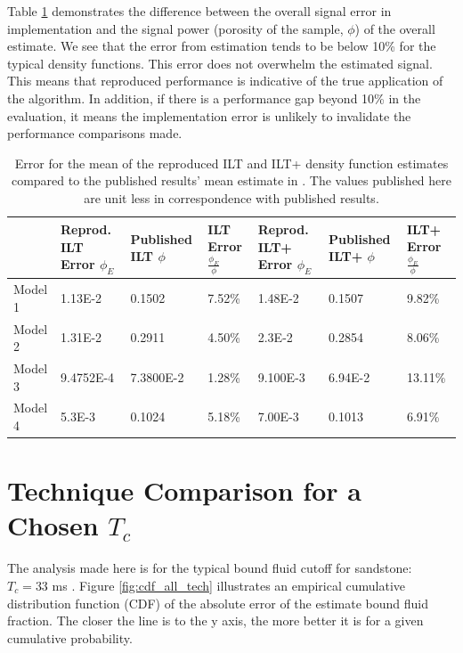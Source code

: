 Table \ref{tab:reproductionError} demonstrates the difference between the overall signal error in implementation and the signal power (porosity of the sample, $\phi$) of the overall estimate. We see that the error from estimation tends to be below 10\% for the typical density functions. This error does not overwhelm the estimated signal. This means that reproduced performance is indicative of the true application of the algorithm. In addition, if there is a performance gap beyond 10\% in the evaluation, it means the implementation error is unlikely to invalidate the performance comparisons made.


\begin{table}[htb!]
\centering
    \begin{tabular}{l p{1.75cm} p{1.75cm} p{1.75cm}  p{1.75cm} p{1.75cm} p{1.75cm}}
    \toprule
    	& Reprod. ILT Error $\phi_E$ & Published ILT $\phi$ & ILT Error $\frac{\phi_E}{\phi}$ & Reprod. ILT+ Error $\phi_E$ & Published ILT+ $\phi$ & ILT+ Error $\frac{\phi_E}{\phi}$  \\
    \midrule
	Model 1 & 1.13E-2 & 0.1502 & 7.52\% & 1.48E-2 & 0.1507 & 9.82\% \\ 
	Model 2 & 1.31E-2 & 0.2911 & 4.50\% & 2.3E-2 & 0.2854 & 8.06\% \\ 
	Model 3 & 9.4752E-4 & 7.3800E-2 & 1.28\% & 9.100E-3 & 6.94E-2 & 13.11\% \\
	Model 4 & 5.3E-3 & 0.1024 & 5.18\% & 7.00E-3 & 0.1013 & 6.91\% \\ 
    \bottomrule

    \end{tabular}
        \caption{Error for the mean of the reproduced ILT and ILT+ density function estimates compared to the published results' mean estimate in \cite{GruberT2Estimation2013}. The values published here are unit less in correspondence with published results.}
    \label{tab:reproductionError}
\end{table}








\section{Technique Comparison for a Chosen $T_c$} \label{section:aChosenTc_evaluation}
The analysis made here is for the typical bound fluid cutoff for sandstone: $T_c = 33$ ms \cite{UsingNMRPetrophysicalKenyon1992nuclear}. Figure \ref{fig:cdf_all_tech} illustrates an empirical cumulative distribution function (CDF) of the absolute error of the estimate bound fluid fraction. The closer the line is to the y axis, the more better it is for a given cumulative probability.

